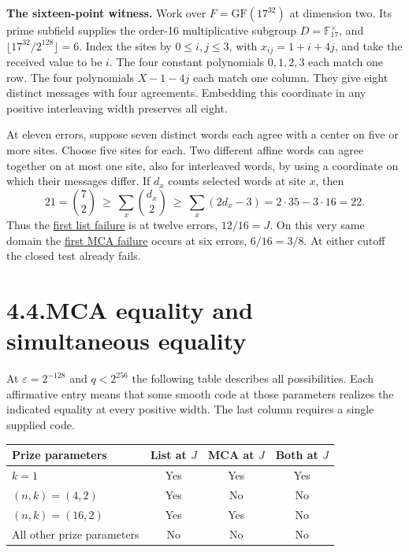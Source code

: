 \documentclass[11pt,letterpaper]{article}
\begin{document}
\textbf{The sixteen-point witness.} Work over $F=\mathrm{GF}(17^{32})$ at dimension two.
Its prime subfield supplies the order-16 multiplicative subgroup $D=\mathbb F_{17}^{\times}$,
and $\lfloor 17^{32}/2^{128}\rfloor=6$. Index the sites by $0\le i,j\le3$, with
$x_{ij}=1+i+4j$, and take the received value to be $i$. The four constant polynomials
$0,1,2,3$ each match one row. The four polynomials $X-1-4j$ each match one column.
They give eight distinct messages with four agreements. Embedding this coordinate
in any positive interleaving width preserves all eight.

At eleven errors, suppose seven distinct words each agree with a center on five or
more sites. Choose five sites for each. Two different affine words can agree together
on at most one site, also for interleaved words, by using a coordinate on which
their messages differ. If $d_x$ counts selected words at site $x$, then
\[
  21=\binom72\ \ge\ \sum_x\binom{d_x}2
     \ \ge\ \sum_x(2d_x-3)=2\cdot35-3\cdot16=22 .
\]
Thus the \href{https://github.com/SlopDotCash/proximityprize/blob/7414125df9ddb8fb4682c9baa619de520ed4bae7/ArkLib/Research/ProximityGap/JohnsonPrimePowerList.lean}{first list failure}
is at twelve errors, $12/16=J$. On this very same domain the
\href{https://github.com/SlopDotCash/proximityprize/blob/7414125df9ddb8fb4682c9baa619de520ed4bae7/ArkLib/Research/ProximityGap/JohnsonPrimePowerDomain.lean}{first MCA failure}
occurs at six errors, $6/16=3/8$. At either cutoff the closed test already fails.

\newpage
\section*{4.4.\quad MCA equality and simultaneous equality}
At $\varepsilon=2^{-128}$ and $q<2^{256}$ the following table describes all possibilities.
Each affirmative entry means that some smooth code at those parameters realizes the
indicated equality at every positive width. The last column requires a single supplied code.
\begin{center}
\begin{tabular}{@{}lccc@{}}\toprule
Prize parameters & List at $J$ & MCA at $J$ & Both at $J$\\\midrule
$k=1$ & Yes & Yes & Yes\\
$(n,k)=(4,2)$ & Yes & No & No\\
$(n,k)=(16,2)$ & Yes & Yes & No\\
All other prize parameters & No & No & No\\\bottomrule
\end{tabular}
\end{center}
\end{document}
